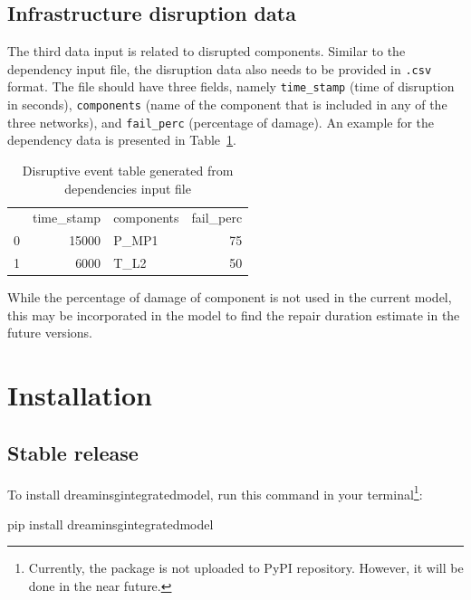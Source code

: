 \documentclass[letterpaper,12pt,english]{sphinxmanual}
\begin{document}
\section{Infrastructure disruption data}
The third data input is related to disrupted components. Similar to the dependency input file, the disruption data also needs to be provided in {\tt *.csv} format. The file should have three fields, namely {\tt time_stamp} (time of disruption in seconds), {\tt components} (name of the component that is included in any of the three networks), and {\tt fail_perc} (percentage of damage). An example for the dependency data is presented in Table~\ref{tab:disruptive_events}.

\begin{table}[h]
	\centering
	\caption{Disruptive event table generated from dependencies input file}
	\begin{tabular}{crlr}
		\multicolumn{1}{l}{} &
		\multicolumn{1}{l}{\cellcolor[HTML]{C0C0C0}time\_stamp} &
		\cellcolor[HTML]{C0C0C0}components &
		\multicolumn{1}{l}{\cellcolor[HTML]{C0C0C0}fail\_perc} \\
		0 &
		\cellcolor[HTML]{FFFFFF}15000 &
		\cellcolor[HTML]{FFFFFF}P\_MP1 &
		\cellcolor[HTML]{FFFFFF}75 \\
		1 &
		\cellcolor[HTML]{EFEFEF}6000 &
		\cellcolor[HTML]{EFEFEF}T\_L2 &
		\cellcolor[HTML]{EFEFEF}50
	\end{tabular}
	\label{tab:disruptive_events}
\end{table}

While the percentage of damage of component is not used in the current model, this may be incorporated in the model to find the repair duration estimate in the future versions.


\chapter{Installation}
\label{\detokenize{index:installation}}

\section{Stable release}
\label{\detokenize{index:stable-release}}
\sphinxAtStartPar
To install dreaminsg\sphinxhyphen{}integrated\sphinxhyphen{}model, run this command in your terminal\footnote{Currently, the package is not uploaded to PyPI repository. However, it will be done in the near future.}:

\begin{sphinxVerbatim}[commandchars=\\\{\}]
pip install dreaminsg\PYGZus{}integrated\PYGZus{}model
\end{sphinxVerbatim}
\end{document}
